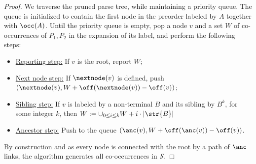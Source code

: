 \begin{proof}
We traverse the pruned parse tree, while maintaining a priority queue. The queue is initialized to contain the first node in the preorder labeled by $A$ together with $\occ(A)$. Until the priority queue is empty, pop a node $v$ and a set $W$ of co-occurrences of $P_1,P_2$ in the expansion of its label, and perform the following steps:
\begin{itemize}
\item\label{step:reporting} \underline{Reporting step:}  If $v$ is the root, report $W$;
\item \label{step:next} \underline{Next node step:} If $\nextnode(v)$ is defined, push $(\nextnode(v),W+\off(\nextnode(v))-\off(v))$;
\item \label{step:siblings} \underline {Sibling step:}  If $v$ is labeled by a non-terminal $B$ and its sibling by $B^k$, for some integer $k$, then $W := \cup_{0 \le i \le k} W+i \cdot |\str{B}|$
\item \label{step:anc} \underline{Ancestor step:} Push to the queue $(\anc(v),W+\off(\anc(v))-\off(v))$. 
\end{itemize}

By construction and as every node is connected with the root by a path of $\anc$ links, the algorithm generates all co-occurrences in $\mathcal{S}$. 


\end{proof}
